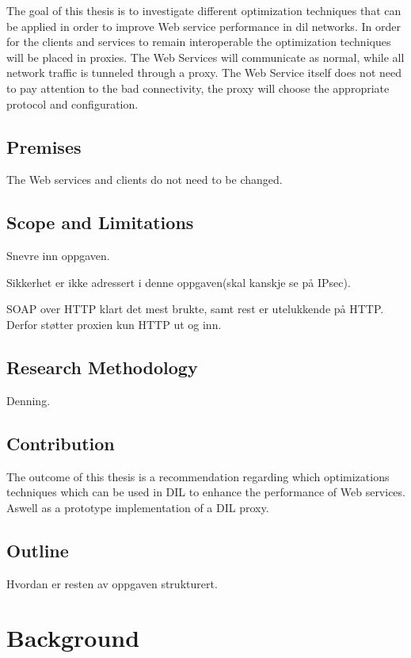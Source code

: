 \documentclass[USenglish]{ifimaster}
\begin{document}
The goal of this thesis is to investigate different optimization techniques that
can be applied in order to improve Web service performance in \gls{dil}
networks. In order for the clients and services to remain interoperable the
optimization techniques will be placed in proxies. The Web Services will
communicate as normal, while all network traffic is tunneled through a proxy.
The Web Service itself does not need to pay attention to the bad connectivity,
the proxy will choose the appropriate protocol and configuration.

\section{Premises}
The Web services and clients do not need to be changed.

\section{Scope and Limitations}
Snevre inn oppgaven.

Sikkerhet er ikke adressert i denne oppgaven(skal kanskje se på IPsec).

SOAP over HTTP klart det mest brukte, samt rest er utelukkende på HTTP. Derfor
støtter proxien kun HTTP ut og inn.

\section{Research Methodology}
Denning.


\section{Contribution}

The outcome of this thesis is a recommendation regarding which optimizations
techniques which can be used in DIL to enhance the performance of Web services.
Aswell as a prototype implementation of a DIL proxy.

\section{Outline}
Hvordan er resten av oppgaven strukturert.


\chapter{Background}

\end{document}
